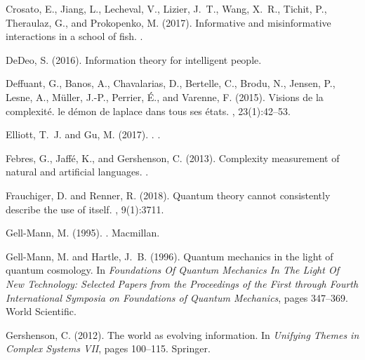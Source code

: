 \begin{thebibliography}{}
Crosato, E., Jiang, L., Lecheval, V., Lizier, J.~T., Wang, X.~R., Tichit, P.,
  Theraulaz, G., and Prokopenko, M. (2017).
\newblock Informative and misinformative interactions in a school of fish.
.

DeDeo, S. (2016).
\newblock Information theory for intelligent people.

Deffuant, G., Banos, A., Chavalarias, D., Bertelle, C., Brodu, N., Jensen, P.,
  Lesne, A., M{\"u}ller, J.-P., Perrier, {\'E}., and Varenne, F. (2015).
\newblock Visions de la complexit{\'e}. le d{\'e}mon de laplace dans tous ses
  {\'e}tats.
, 23(1):42--53.

{Elliott}, T.~J. and {Gu}, M. (2017).
.
.

Febres, G., Jaff{\'e}, K., and Gershenson, C. (2013).
\newblock Complexity measurement of natural and artificial languages.
.

Frauchiger, D. and Renner, R. (2018).
\newblock Quantum theory cannot consistently describe the use of itself.
, 9(1):3711.

Gell-Mann, M. (1995).
.
\newblock Macmillan.

Gell-Mann, M. and Hartle, J.~B. (1996).
\newblock Quantum mechanics in the light of quantum cosmology.
\newblock In {\em Foundations Of Quantum Mechanics In The Light Of New
  Technology: Selected Papers from the Proceedings of the First through Fourth
  International Symposia on Foundations of Quantum Mechanics}, pages 347--369.
  World Scientific.

Gershenson, C. (2012).
\newblock The world as evolving information.
\newblock In {\em Unifying Themes in Complex Systems VII}, pages 100--115.
  Springer.


\end{thebibliography}

